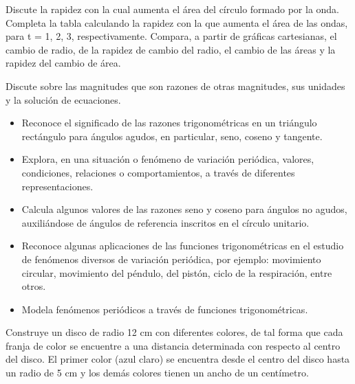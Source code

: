 
Discute la rapidez con la cual aumenta el área del círculo formado por la onda. Completa la tabla calculando la rapidez con la que aumenta el área de las ondas, para t = 1, 2, 3, respectivamente. Compara, a partir de gráficas cartesianas, el cambio de radio, de la rapidez de cambio del radio, el cambio de las áreas y la rapidez del cambio de área.


Discute sobre las magnitudes que son razones de otras magnitudes, sus unidades y la solución de ecuaciones.


\evidencias

\begin{itemize}
  \item Reconoce el significado de las razones trigonométricas en un triángulo rectángulo para ángulos agudos, en particular, seno, coseno y tangente.
  \item Explora, en una situación o fenómeno de variación periódica, valores, condiciones, relaciones o comportamientos, a través de diferentes representaciones.
  \item Calcula algunos valores de las razones seno y coseno para ángulos no agudos, auxiliándose de ángulos de referencia inscritos en el círculo unitario.
  \item Reconoce algunas aplicaciones de las funciones trigonométricas en el estudio de fenómenos diversos de variación periódica, por ejemplo: movimiento circular, movimiento del péndulo, del pistón, ciclo de la respiración, entre otros.
  \item Modela fenómenos periódicos a través de funciones trigonométricas.
\end{itemize}

\ejemplo

Construye un disco de radio 12 cm con diferentes colores, de tal forma que cada franja de color se encuentre a una distancia determinada con respecto al centro del disco. El primer color (azul claro) se encuentra desde el centro del disco hasta un radio de 5 cm y los demás colores tienen un ancho de un centímetro.


